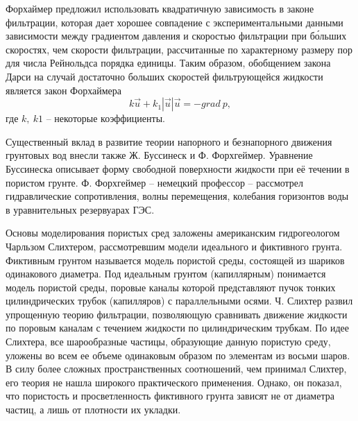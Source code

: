 Форхаймер предложил использовать квадратичную зависимость в законе фильтрации, которая дает хорошее совпадение с экспериментальными данными зависимости между градиентом давления и скоростью фильтрации при б\'{о}льших скоростях,
чем скорости фильтрации, рассчитанные по характерному размеру пор для числа Рейнольдса порядка единицы.
Таким образом, обобщением закона Дарси на случай достаточно больших скоростей фильтрующейся жидкости является закон Форхаймера
\begin{equation}
\label{Darcy}
  k\overrightarrow{u} + k_1|\overrightarrow{u}|\overrightarrow{u}=-grad \ p,
\end{equation}
где $k, \ k1$ -- некоторые коэффициенты.

Существенный вклад в развитие теории напорного и безнапорного движения грунтовых вод внесли также Ж. Буссинеск и Ф. Форхгеймер.
Уравнение Буссинеска описывает форму свободной поверхности жидкости при её течении в пористом грунте. Ф. Форхгеймер -- немецкий профессор -- рассмотрел гидравлические сопротивления, волны перемещения, колебания горизонтов 
воды в уравнительных резервуарах ГЭС.

Основы моделирования пористых сред заложены американским гидрогеологом Чарльзом Слихтером, рассмотревшим модели идеального и фиктивного грунта.
Фиктивным грунтом называется модель пористой среды, состоящей из шариков одинакового диаметра. Под идеальным грунтом (капиллярным) понимается модель пористой среды, поровые каналы которой представляют пучок тонких 
цилиндрических трубок (капилляров) с параллельными осями. Ч. Слихтер развил упрощенную теорию фильтрации, позволяющую сравнивать движение жидкости по поровым каналам с течением жидкости по цилиндрическим трубкам.
По идее Слихтера, все шарообразные частицы, образующие данную пористую среду, уложены во всем ее объеме одинаковым образом по элементам из восьми шаров.
В силу более сложных пространственных соотношений, чем принимал Слихтер, его теория не нашла широкого практического применения. Однако, он показал, что пористость и просветленность фиктивного грунта зависят не от диаметра
частиц, а лишь от плотности их укладки.

